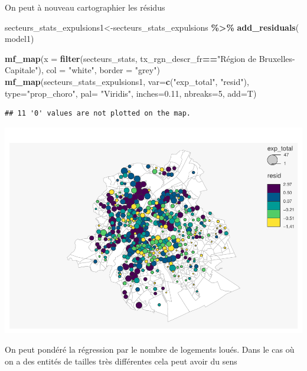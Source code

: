 \documentclass[
]{book}
\newenvironment{Shaded}{\begin{snugshade}}{\end{snugshade}}
\newcommand{\AttributeTok}[1]{\textcolor[rgb]{0.13,0.29,0.53}{#1}}
\newcommand{\DecValTok}[1]{\textcolor[rgb]{0.00,0.00,0.81}{#1}}
\newcommand{\FloatTok}[1]{\textcolor[rgb]{0.00,0.00,0.81}{#1}}
\newcommand{\FunctionTok}[1]{\textcolor[rgb]{0.13,0.29,0.53}{\textbf{#1}}}
\newcommand{\NormalTok}[1]{#1}
\newcommand{\OtherTok}[1]{\textcolor[rgb]{0.56,0.35,0.01}{#1}}
\newcommand{\SpecialCharTok}[1]{\textcolor[rgb]{0.81,0.36,0.00}{\textbf{#1}}}
\newcommand{\StringTok}[1]{\textcolor[rgb]{0.31,0.60,0.02}{#1}}
\begin{document}
On peut à nouveau cartographier les résidus

\begin{Shaded}
\begin{Highlighting}[]
\NormalTok{secteurs\_stats\_expulsions1}\OtherTok{\textless{}{-}}\NormalTok{secteurs\_stats\_expulsions }\SpecialCharTok{\%\textgreater{}\%}
  \FunctionTok{add\_residuals}\NormalTok{( model1)}

\FunctionTok{mf\_map}\NormalTok{(}\AttributeTok{x =} \FunctionTok{filter}\NormalTok{(secteurs\_stats, tx\_rgn\_descr\_fr}\SpecialCharTok{==}\StringTok{"Région de Bruxelles{-}Capitale"}\NormalTok{),}
       \AttributeTok{col =} \StringTok{"white"}\NormalTok{, }\AttributeTok{border =} \StringTok{"grey"}\NormalTok{)}
\FunctionTok{mf\_map}\NormalTok{(secteurs\_stats\_expulsions1,}
       \AttributeTok{var=}\FunctionTok{c}\NormalTok{(}\StringTok{"exp\_total"}\NormalTok{, }\StringTok{"resid"}\NormalTok{),}
       \AttributeTok{type=}\StringTok{"prop\_choro"}\NormalTok{,}
       \AttributeTok{pal=} \StringTok{"Viridis"}\NormalTok{,}
       \AttributeTok{inches=}\FloatTok{0.11}\NormalTok{,}
       \AttributeTok{nbreaks=}\DecValTok{5}\NormalTok{,}
       \AttributeTok{add=}\NormalTok{T)}
\end{Highlighting}
\end{Shaded}

\begin{verbatim}
## 11 '0' values are not plotted on the map.
\end{verbatim}

\includegraphics{manuel_geo_quanti_files/figure-latex/unnamed-chunk-39-1.pdf}

On peut pondéré la régression par le nombre de logements loués. Dans le
cas où on a des entités de tailles très différentes cela peut avoir du
sens
\end{document}
